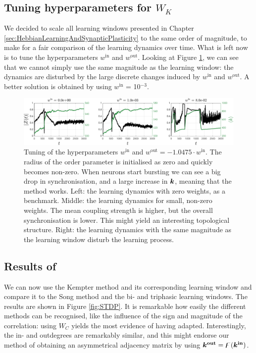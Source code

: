 \subsection{Tuning hyperparameters for \texorpdfstring{$W_K$}{TEXT}}
We decided to scale all learning windows presented in Chapter \ref{sec:HebbianLearningAndSynapticPlasticity} to the same order of magnitude, to make for a fair comparison of the learning dynamics over time. What is left now is to tune the hyperparameters $w^{\mathrm{in}}$ and $w^{\mathrm{out}}$. Looking at Figure \ref{fig:KempterWinWout}, we can see that we cannot simply use the same magnitude as the learning window: the dynamics are disturbed by the large discrete changes induced by $w^{\mathrm{in}}$ and $w^{\mathrm{out}}$. A better solution is obtained by using $w^{\mathrm{in}}$ = 10$^{-3}$.

\begin{figure}[H]
\centering
\includegraphics[width = \textwidth]{../Figures/Learning/KempterWinWout.pdf}
\caption{Tuning of the hyperparameters $w^{\mathrm{in}}$ and $w^{\mathrm{out}} = -1.0475 \cdot w^{\mathrm{in}}$. The radius of the order parameter is initialised as zero and quickly becomes non-zero. When neurons start bursting we can see a big drop in synchronisation, and a large increase in ${\boldsymbol{k}}$, meaning that the \STDP method works. Left: the learning dynamics with zero weights, as a benchmark. Middle: the learning dynamics for small, non-zero weights. The mean coupling strength is higher, but the overall synchronisation is lower. This might yield an interesting topological structure. Right: the learning dynamics with the same magnitude as the learning window disturb the learning process.}
\label{fig:KempterWinWout}
\end{figure}


\subsection{Results of \STDP} \label{sec:STDPlearning} %
We can now use the Kempter method and its corresponding learning window and compare it to the Song method and the bi- and triphasic learning windows. The results are shown in Figure \ref{fig:STDP}. It is remarkable how easily the different methods can be recognised, like the influence of the sign and magnitude of the correlation: using $W_C$ yields the most evidence of having adapted. Interestingly, the in- and outdegrees are remarkably similar, and this might endorse our method of obtaining an asymmetrical adjacency matrix by using $\boldsymbol{{k^{\rm out}}} = {\digamma} ( {\boldsymbol{k^{\rm in}}} )$. \\

